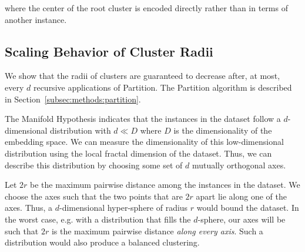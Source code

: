 where the center of the root cluster is encoded directly rather than in terms of another instance.



\subsection{Scaling Behavior of Cluster Radii}
\label{subsec:methods:radii-scaling-behavior}

We show that the radii of clusters are guaranteed to decrease after, at most, every $d$ recursive applications of Partition.
The Partition algorithm is described in Section~\ref{subsec:methods:partition}.

The Manifold Hypothesis indicates that the instances in the dataset follow a $d$-dimensional distribution with $d \ll D$ where $D$ is the dimensionality of the embedding space.
We can measure the dimensionality of this low-dimensional distribution using the local fractal dimension of the dataset.
Thus, we can describe this distribution by choosing some set of $d$ mutually orthogonal axes.

Let $2r$ be the maximum pairwise distance among the instances in the dataset.
We choose the axes such that the two points that are $2r$ apart lie along one of the axes.
Thus, a $d$-dimensional hyper-sphere of radius $r$ would bound the dataset.
In the worst case, e.g. with a distribution that fills the $d$-sphere, our axes will be such that $2r$ is the maximum pairwise distance \textit{along every axis}.
Such a distribution would also produce a balanced clustering.

